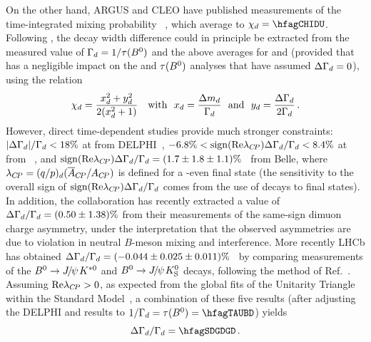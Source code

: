 On the other hand, ARGUS and CLEO have published 
measurements of the time-integrated mixing probability 
\chid~\cite{Albrecht:1992yd,*Albrecht:1993gr_cont,Bartelt:1993cf,Behrens:2000qu}, 
which average to $\chid =\hfagCHIDU$.
Following , 
the decay width difference \DGd could 
in principle be extracted from the
measured value of $\Gamma_{d}=1/\tau(B^0)$ and the above averages for 
\dmd and \chid 
(provided that \DGd has a negligible impact on 
the \dmd and $\tau(B^0)$ analyses that have assumed $\Delta\Gamma_{d}=0$), 
using the relation
\begin{equation}
\chid = \frac{\xd^2+\yd^2}{2(\xd^2+1)} ~~~ \mbox{with} ~~ \xd=\frac{\dmd}{\Gd} 
~~ \mbox{and} ~~ \yd=\frac{\DGd}{2\Gd} \,.
\labe{chid_definition}
\end{equation}
However, direct time-dependent studies provide much stronger constraints: 
$|\Delta\Gamma_{d}|/\Gamma_{d} < 18\%$ at  from DELPHI~\cite{Abdallah:2002mr},
$-6.8\% < {\rm sign}({\rm Re} \lambda_{C\!P}) \Delta\Gamma_{d}/\Gamma_{d} < 8.4\%$
at  from \babar~\cite{Aubert:2003hd,*Aubert:2004xga_mod_cont},
and ${\rm sign}({\rm Re} \lambda_{C\!P})\Delta\Gamma_{d}/\Gamma_{d} = (1.7 \pm 1.8 \pm 1.1)\%$~\cite{Higuchi:2012kx}
from Belle, 
where $\lambda_{\CP} = (q/p)_{\particle{d}} (\bar{A}_{\CP}/A_{\CP})$
is defined for a \CP-even final state 
(the sensitivity to the overall sign of 
${\rm sign}({\rm Re} \lambda_{C\!P}) \Delta\Gamma_{d}/\Gamma_{d}$ comes
from the use of \Bd decays to \CP final states).
In addition, the \dzero collaboration has recently extracted a value of 
$\Delta\Gamma_{d}/\Gamma_{d}=(0.50 \pm 1.38)\%$\cite{Abazov:2013uma,*Abazov:2011yk_mod,*Abazov:2010hv_mod_cont,*Abazov:2010hj_mod_cont,*Abazov:2011yk_cont}
from their measurements of the same-sign dimuon charge asymmetry, 
under the interpretation that 
the observed asymmetries are due to \CP violation in neutral $B$-meson mixing and interference.
More recently LHCb has obtained $\Delta\Gamma_{d}/\Gamma_{d}=(-0.044 \pm 0.025 \pm 0.011)\%$~\cite{Aaij:2014owa}
by comparing measurements of the $B^0 \to {J\mskip -3mu/\mskip -2mu\psi\mskip 2mu} K^{*0}$ and $B^0 \to {J\mskip -3mu/\mskip -2mu\psi\mskip 2mu} K^0_{\rm S}$
decays, following the method of Ref.~\cite{Gershon:2010wx}.
Assuming ${\rm Re} \lambda_{C\!P} > 0$, as expected from the global fits
of the Unitarity Triangle within the Standard Model~\cite{Charles:2011va_mod,*Bona:2006ah},
a combination of these five results (after adjusting the DELPHI and \babar results to  
$1/\Gd=\tau(\Bd)=\hfagTAUBD$) yields
\begin{equation}
\DGGd  = \hfagSDGDGD \,.
\end{equation}

